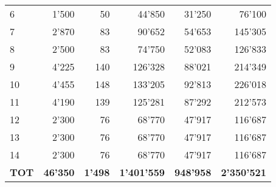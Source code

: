 \begin{table}[h!]
\begin{tabular}{lrrrrr}
6        & 1'500                                                                  & 50          & 44'850                                                          & 31'250          & 76'100    \\
7        & 2'870                                                                  & 83          & 90'652                                                          & 54'653          & 145'305   \\
8        & 2'500                                                                  & 83          & 74'750                                                          & 52'083          & 126'833   \\
9        & 4'225                                                                  & 140         & 126'328                                                         & 88'021          & 214'349   \\
10       & 4'455                                                                  & 148         & 133'205                                                         & 92'813          & 226'018   \\
11       & 4'190                                                                  & 139         & 125'281                                                         & 87'292          & 212'573   \\
12       & 2'300                                                                  & 76          & 68'770                                                          & 47'917          & 116'687   \\
13       & 2'300                                                                  & 76          & 68'770                                                          & 47'917          & 116'687   \\
14       & 2'300                                                                  & 76          & 68'770                                                          & 47'917          & 116'687   \\
\midrule
\textbf{TOT}      & \textbf{46'350}                              & \textbf{1'498}       & \textbf{1'401'559}      & \textbf{948'958}         & \textbf{2'350'521} \\
\bottomrule
\end{tabular}
\end{table}